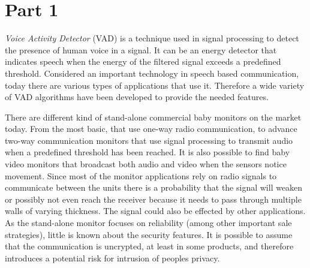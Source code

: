 \section{Part 1}
\emph{Voice Activity Detector} (VAD) is a technique used in signal
processing to detect the presence of human voice in a signal. It can be
an energy detector that indicates speech when the energy of the filtered signal 
exceeds a predefined threshold. Considered an important technology in speech 
based communication, today there are various types of applications that use it. 
Therefore a wide variety of VAD algorithms have been developed to provide the needed features. 

There are different kind of stand-alone commercial baby monitors on the market today. 
From the most basic, that use one-way radio communication, to advance two-way communication
monitors that use signal processing to transmit audio when a predefined threshold has been 
reached. It is also possible to find baby video monitors that broadcast both audio and video when 
the sensors notice movement. Since most of the monitor applications rely on radio signals to 
communicate between the units there is a probability that the signal 
will weaken or possibly not even reach the receiver because it needs to pass through multiple walls
of varying thickness. The signal could also be effected by other applications. 
As the stand-alone monitor focuses on reliability (among other important sale strategies), 
little is known about the security features. It is possible to assume that the communication 
is uncrypted, at least in some products, and therefore introduces a potential risk for 
intrusion of peoples privacy. 

